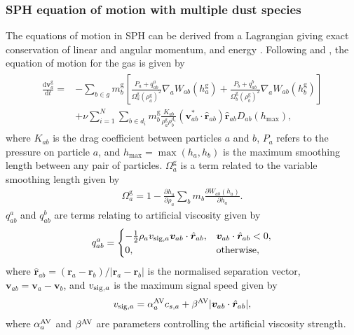 \documentclass[fleqn,usenatbib]{mnras}
\newcommand{\g}{\mathrm{g}}
\newcommand{\dd}{\mathrm{d}}
\let\vec\bm
\begin{document}
\subsubsection{SPH equation of motion with multiple dust species}

The equations of motion in SPH can be derived from a Lagrangian giving exact
conservation of linear and angular momentum, and energy
\citep{Price2012JCoPh.231..759P}. Following \citet{Laibe2012MNRAS.420.2345L} and
\citet{Price2020MNRAS.495.3929P}, the equation of motion for the gas is given by
%
\begin{align}
   \label{eqn:sph-gas-velocity}
   \begin{split}
      \frac{\dd \vec{v}^{\g}_a}{\dd t} = &- \sum_{b \in g} m^{\g}_b \left[
         \frac{P_a + q_{ab}^a}{\Omega^{\g}_a {\left(\rho^{\g}_a\right)}^2} \nabla_a W_{ab}(h^{\g}_a) +
         \frac{P_b + q_{ab}^b}{\Omega^{\g}_b {\left(\rho^{\g}_b\right)}^2} \nabla_a W_{ab}(h^{\g}_b)
      \right] \\
      &+ \nu \sum_{i=1}^N \sum_{b \in d_i} m^{\g}_b \frac{K_{ab}}{\rho^{\g}_a \rho^{\dd_i}_b}
         (\vec{v}^{*}_{ab} \cdot \hat{\vec{r}}_{ab}) \hat{\vec{r}}_{ab} D_{ab}(h_{\max}),
   \end{split}
\end{align}
%
where \(K_{ab}\) is the drag coefficient between particles \(a\) and \(b\),
\(P_a\) refers to the pressure on particle \(a\), and \(h_{\max} = \max(h_a,
h_b)\) is the maximum smoothing length between any pair of particles.
\(\Omega^{\g}_a\) is a term related to the variable smoothing length given by
%
\begin{align}
   \Omega^{\g}_a = 1 - \frac{\partial h_a}{\partial \rho_a}
      \sum_b m_b \frac{\partial W_{ab}(h_a)}{\partial h_a}.
\end{align}
%
\(q_{ab}^a\) and \(q_{ab}^b\) are terms relating to artificial viscosity given
by
%
\begin{align}
   q_{ab}^a =
   \begin{cases}
      -\frac{1}{2} \rho_a v_{{\rm sig}, a} \vec{v}_{ab} \cdot \hat{\vec{r}}_{ab},
         &\vec{v}_{ab} \cdot \hat{\vec{r}}_{ab} < 0,\\
      0, &\mathrm{otherwise},
   \end{cases}
\end{align}
where \(\hat{\vec{r}}_{ab} = (\vec{r}_a - \vec{r}_b)/|\vec{r}_a - \vec{r}_b|\)
is the normalised separation vector, \(\vec{v}_{ab} = \vec{v}_a -
\vec{v}_b\), and \(v_{{\rm sig}, a}\) is the maximum signal speed given by
%
\begin{align}
   v_{{\rm sig}, a} = \alpha_a^{\rm AV} c_{s,a}
      + \beta^{\rm AV} | \vec{v}_{ab} \cdot \hat{\vec{r}}_{ab} |,
\end{align}
%
where \(\alpha_a^{\rm AV}\) and \(\beta^{\rm AV}\) are parameters controlling
the artificial viscosity strength.
\end{document}
